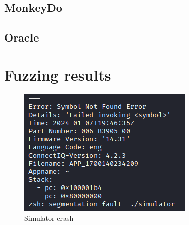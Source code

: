 \subsection*{MonkeyDo}


\subsection*{Oracle}

\section{Fuzzing results}

\begin{figure}[h]
    \centering
    \includegraphics[width=0.4\linewidth]{../../images/simulator-crash}
    \caption{Simulator crash}
    \label{fig:simulator-crash}
\end{figure}